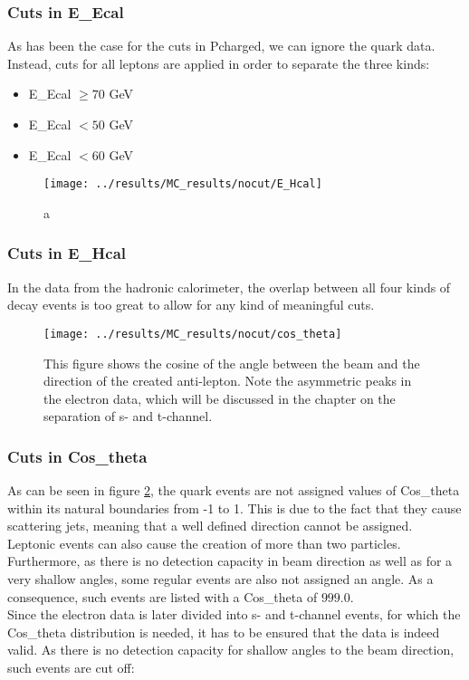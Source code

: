 \subsubsection{Cuts in E\_Ecal}
As has been the case for the cuts in Pcharged, we can ignore the quark data. Instead, cuts for all leptons are applied in order to separate the three kinds:

\begin{itemize}
	\item{ E\_Ecal $\ge70$ GeV}
	\item{ E\_Ecal $<50$ GeV}
	\item{ E\_Ecal $<60$ GeV}
\end{itemize}

\newpage
\begin{figure}[h]
\centering
\texttt{[image: ../results/MC\_results/nocut/E\_Hcal]}
\caption[E\_Hcal in simulation data]{a}
\label{fig:E_Hcal}
\end{figure}

\subsubsection{Cuts in E\_Hcal}
In the data from the hadronic calorimeter, the overlap between all four kinds of decay events is too great to allow for any kind of meaningful cuts.

\newpage
\begin{figure}[h]
\centering
\texttt{[image: ../results/MC\_results/nocut/cos\_theta]}
\caption[Cos\_theta in simulation data]{This figure shows the cosine of the angle between the beam and the direction of the created anti-lepton. Note the asymmetric peaks in the electron data, which will be discussed in the chapter on the separation of s- and t-channel.}
\label{fig:cos_theta}
\end{figure}

\subsubsection{Cuts in Cos\_theta}
As can be seen in figure \ref{fig:cos_theta}, the quark events are not assigned values of Cos\_theta within its natural boundaries from -1 to 1. This is due to the fact that they cause scattering jets, meaning that a well defined direction cannot be assigned. Leptonic events can also cause the creation of more than two particles. Furthermore, as there is no detection capacity in beam direction as well as for a very shallow angles, some regular events are also not assigned an angle. As a consequence, such events are listed with a Cos\_theta of $999.0$.\\
Since the electron data is later divided into s- and t-channel events, for which the Cos\_theta distribution is needed, it has to be ensured that the data is indeed valid. As there is no detection capacity for shallow angles to the beam direction, such events are cut off:

